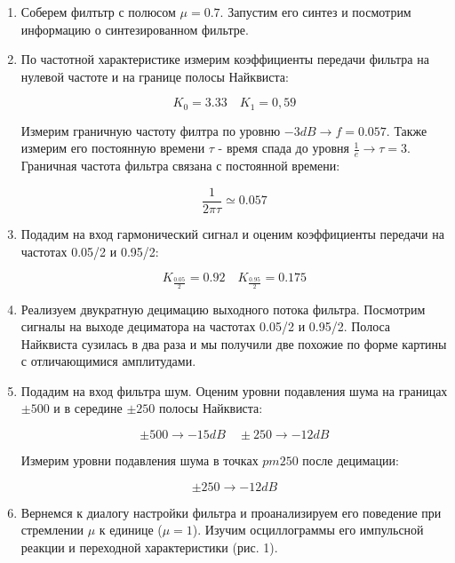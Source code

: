 \documentclass[a4paper, 12pt]{article}%
\begin{document}
\begin{enumerate}
\item Соберем филтьтр с полюсом $\mu = 0.7$. Запустим его синтез и посмотрим информацию о синтезированном фильтре.

\item По частотной характеристике измерим коэффициенты передачи фильтра на нулевой частоте и на границе полосы Найквиста:

\[K_0 = 3.33 \quad K_1 = 0,59\]

Измерим граничную частоту филтра по уровню $-3 dB \rightarrow f = 0.057$. Также измерим его постоянную времени $\tau$ - время спада до уровня $\frac{1}{e} \rightarrow \tau = 3$. Граничная частота фильтра связана с постоянной времени:

\[\frac{1}{2\pi \tau} \simeq 0.057\]

\item Подадим на вход гармонический сигнал и оценим коэффициенты передачи на частотах 0.05/2 и 0.95/2:

\[K_{\frac{0.05}{2}} = 0.92 \quad K_{\frac{0.95}{2}} = 0.175\]

\item Реализуем двукратную децимацию выходного потока фильтра. Посмотрим сигналы на выходе дециматора на частотах 0.05/2 и 0.95/2. Полоса Найквиста сузилась в два раза и мы получили две похожие по форме картины с отличающимися амплитудами.

\item Подадим на вход фильтра шум. Оценим уровни подавления шума на границах $\pm 500$ и в середине $\pm 250$ полосы Найквиста:

\[\pm 500 \rightarrow -15 dB \quad \pm 250 \rightarrow -12 dB\]

Измерим уровни подавления шума в точках $pm 250$ после децимации:

\[\pm 250\rightarrow -12 dB\]

\item Вернемся к диалогу настройки фильтра и проанализируем его поведение при стремлении $\mu$ к единице ($\mu = 1$). Изучим осциллограммы его импульсной реакции и переходной характеристики (рис. 1).


\end{enumerate}
\end{document}
